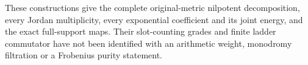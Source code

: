 These constructions give the complete original-metric
nilpotent decomposition, every Jordan multiplicity, every
exponential coefficient and its joint energy, and the exact
full-support maps. Their slot-counting grades and finite
ladder commutator have not been identified with an arithmetic
weight, monodromy filtration or a Frobenius purity statement.
